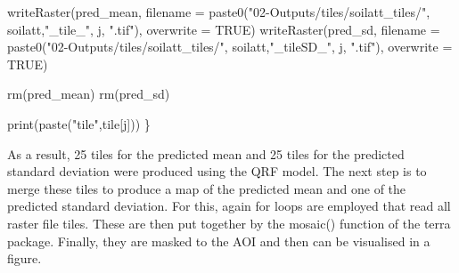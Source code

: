 \documentclass[
  10pt,
  b5paper,
  oneside]{book}
\newenvironment{Shaded}{\begin{snugshade}}{\end{snugshade}}
\newcommand{\AttributeTok}[1]{\textcolor[rgb]{0.77,0.63,0.00}{#1}}
\newcommand{\ConstantTok}[1]{\textcolor[rgb]{0.00,0.00,0.00}{#1}}
\newcommand{\FunctionTok}[1]{\textcolor[rgb]{0.00,0.00,0.00}{#1}}
\newcommand{\NormalTok}[1]{#1}
\newcommand{\StringTok}[1]{\textcolor[rgb]{0.31,0.60,0.02}{#1}}
\begin{document}
\begin{Shaded}
\begin{Highlighting}[]
  \FunctionTok{writeRaster}\NormalTok{(pred\_mean, }
              \AttributeTok{filename =} \FunctionTok{paste0}\NormalTok{(}\StringTok{"02{-}Outputs/tiles/soilatt\_tiles/"}\NormalTok{,}
\NormalTok{                                soilatt,}\StringTok{"\_tile\_"}\NormalTok{, j, }\StringTok{".tif"}\NormalTok{), }
              \AttributeTok{overwrite =} \ConstantTok{TRUE}\NormalTok{)}
  \FunctionTok{writeRaster}\NormalTok{(pred\_sd, }
              \AttributeTok{filename =} \FunctionTok{paste0}\NormalTok{(}\StringTok{"02{-}Outputs/tiles/soilatt\_tiles/"}\NormalTok{,}
\NormalTok{                                soilatt,}\StringTok{"\_tileSD\_"}\NormalTok{, j, }\StringTok{".tif"}\NormalTok{), }
              \AttributeTok{overwrite =} \ConstantTok{TRUE}\NormalTok{)}
  
  \FunctionTok{rm}\NormalTok{(pred\_mean)}
  \FunctionTok{rm}\NormalTok{(pred\_sd)}
  
  
  \FunctionTok{print}\NormalTok{(}\FunctionTok{paste}\NormalTok{(}\StringTok{"tile"}\NormalTok{,tile[j]))}
\NormalTok{\}}
\end{Highlighting}
\end{Shaded}

As a result, 25 tiles for the predicted mean and 25 tiles for the predicted standard deviation were produced using the QRF model. The next step is to merge these tiles to produce a map of the predicted mean and one of the predicted standard deviation. For this, again for loops are employed that read all raster file tiles. These are then put together by the mosaic() function of the terra package. Finally, they are masked to the AOI and then can be visualised in a figure.
\end{document}
